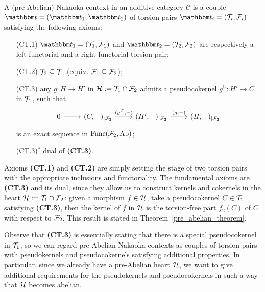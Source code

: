 A (pre-Abelian) Nakaoka context in an additive category $\mathscr{C}$ is a couple $\t=(\t_1,\t_2)$ of torsion pairs $\t_i=(\T_i,\F_i)$ satisfying the following axioms:

\begin{enumerate}
  \item[(CT.1)] $\t_1=(\T_1,\F_1)$ and $\t_2=(\T_2,\F_2)$ are respectively a left functorial and a right functorial torsion pair;
  \item[(CT.2)] $\mathcal{T}_2\subseteq \mathcal{T}_1$ (equiv. $\mathcal{F}_1\subseteq\mathcal{F}_2$);
  \item[(CT.3)] any  $g\colon H\to H'$ in $\mathcal{H}:=\mathcal{T}_1\cap\mathcal{F}_2$ admits a pseudocokernel $g^C\colon H'\to C$ in $\mathcal{T}_1$, such that
    \begin{equation*}
      \begin{tikzcd}
        0\arrow{r} &(C,-)_{|\F_2}\arrow{r}{(g^C,-)} & (H',-)_{|\F_2}\arrow{r}{(g,-)}& (H,-)_{|\F_2}
      \end{tikzcd}
    \end{equation*}
    is an exact sequence in $\mathrm{Func}(\mathcal{F}_2,\mathrm{Ab})$;
  \item[(CT.3)$^\ast$] dual of \textbf{(CT.3)}.
\end{enumerate}

Axioms \textbf{(CT.1)} and \textbf{(CT.2)} are simply setting the stage of two torsion pairs with the appropriate inclusions and functoriality. The fundamental axioms are \textbf{(CT.3)} and its dual, since they allow us to construct kernels and cokernels in the heart $\mathcal{H}:=\mathcal{T}_1\cap\mathcal{F}_2$: given a morphism $f\in\mathcal{H}$, take a pseudocokernel $C\in\mathcal{T}_1$ satisfying \textbf{(CT.3)}, then the kernel of $f$ in $\mathcal{H}$ is the torsion-free part $f_2(C)$ of $C$ with respect to $\mathcal{F}_2$. This result is stated in Theorem~\ref{pre_abelian_theorem}.

Observe that \textbf{(CT.3)} is essentially stating that there is a special pseudocokernel in $\mathcal{T}_1$, so we can regard pre-Abelian Nakaoka contexts as couples of torsion pairs with pseudokernels and pseudocokernels satisfying additional properties. In particular, since we already have a pre-Abelian heart $\mathcal{H}$, we want to give additional requirements for the pseudokernels and pseudocokernels in such a way that $\mathcal{H}$ becomes abelian.

